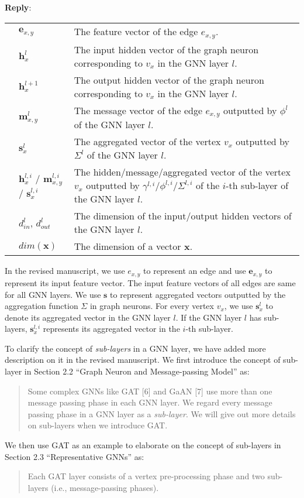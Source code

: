 \documentclass[12pt]{article}
\newcommand{\MyVec}[1]{\boldsymbol{#1}}
\newcommand{\hvec}[1]{\hat{\boldsymbol{h}}_{#1}}
\newcommand{\Param}[1]{\textcolor{blue}{#1}}
\newenvironment{myquote}%
{\begin{leftbar}\begin{quote}}
{\end{quote}\end{leftbar}}
\newenvironment{reply}
   {\medskip \noindent \textbf{Reply}:\  }
   {\medskip}
\begin{document}
\begin{reply}
\begin{table}[H]
\begin{tabular}{p{3em}lp{35em}}
        & $\boldsymbol{e}_{x,y}$ & The feature vector of the edge $e_{x,y}$.  \\
        & $\boldsymbol{h}_x^{l}$ &  The {input} hidden vector of the graph neuron corresponding to $v_x$ in the GNN layer $l$. \\
        & $\boldsymbol{h}_x^{l+1}$ &  The {output} hidden vector of the graph neuron corresponding to $v_x$ in the GNN layer $l$.\\
        & $\boldsymbol{m}_{x,y}^l$ & The message vector of the edge $e_{x,y}$ outputted by $\phi^l$ of the GNN layer $l$. \\
        & $\boldsymbol{s}_{x}^l$ & The aggregated vector of the vertex $v_x$ outputted by $\Sigma^l$ of the GNN layer $l$. \\
        & $\boldsymbol{h}_{x}^{l,i}$ / $\boldsymbol{m}_{x,y}^{l,i}$ / $\boldsymbol{s}_{x}^{l,i}$ & The hidden/message/aggregated vector of the vertex $v_x$ outputted by $\gamma^{l,i}$/$\phi^{l,i}$/$\Sigma^{l,i}$ of the $i$-th sub-layer of the GNN layer $l$. \\
        & $d^l_{in}$, $d^l_{out}$ &  The dimension of the input/output hidden vectors of the GNN layer $l$. \\
        & $dim(\MyVec{x})$ & The dimension of a vector $\MyVec{x}$. \\
        \bottomrule
    \end{tabular}
\end{table}

    
    In the revised manuscript, we use $e_{x,y}$ to represent an edge and use $\boldsymbol{e}_{x,y}$ to represent its input feature vector.
    The input feature vectors of all edges are same for all GNN layers.
    We use $\boldsymbol{s}$ to represent aggregated vectors outputted by the aggregation function $\Sigma$ in graph neurons.
    For every vertex $v_x$, we use $\boldsymbol{s}^l_x$ to denote its aggregated vector in the GNN layer $l$.
    If the GNN layer $l$ has sub-layers, $\boldsymbol{s}^{l,i}_x$ represents its aggregated vector in the $i$-th sub-layer.
    
    To clarify the concept of \emph{sub-layers} in a GNN layer, we have added more description on it in the revised manuscript.
    We first introduce the concept of sub-layer in Section 2.2 ``Graph Neuron and Message-passing Model'' as:
    \begin{myquote}
        Some complex GNNs like GAT [6] and GaAN [7] use more than one message passing phase in each GNN layer.
        We regard every message passing phase in a GNN layer as a \emph{sub-layer}.
        We will give out more details on sub-layers when we introduce GAT.
    \end{myquote}
    We then use GAT as an example to elaborate on the concept of sub-layers in Section 2.3 ``Representative GNNs'' as:
    \begin{myquote}
        \newcommand{\GATCalcWeight}{\exp(LeakyReLU(\Param{\MyVec{a}}^T[\hvec{y}[k] \parallel \hvec{x}[k]]))}
        Each GAT layer consists of a vertex pre-processing phase and two sub-layers (i.e., message-passing phases).
        

\end{myquote}
\end{reply}
\end{document}
